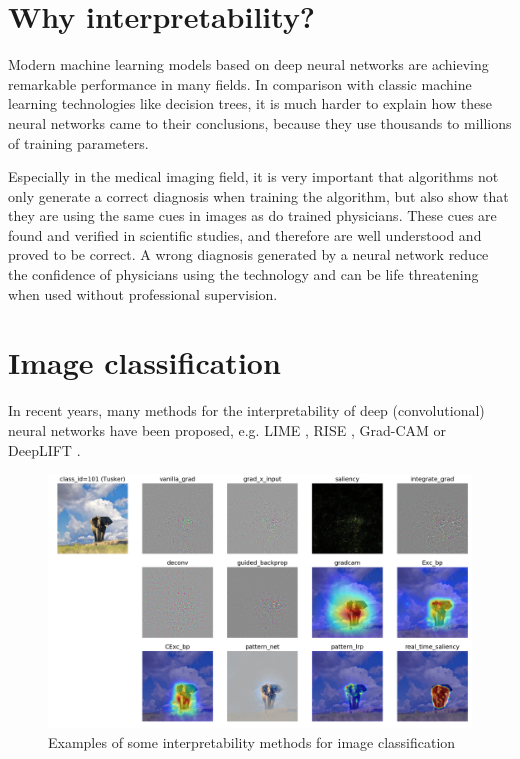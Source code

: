\section{Why interpretability?}
Modern machine learning models based on deep neural networks are achieving remarkable performance in many fields. In comparison with classic machine learning technologies like decision trees, it is much harder to explain how these neural networks came to their conclusions, because they use thousands to millions of training parameters.

Especially in the medical imaging field, it is very important that algorithms not only generate a correct diagnosis when training the algorithm, but also show that they are using the same cues in images as do trained physicians. These cues are found and verified in scientific studies, and therefore are well understood and proved to be correct. A wrong diagnosis generated by a neural network reduce the confidence of physicians using the technology and can be life threatening when used without professional supervision.

\section{Image classification}
In recent years, many methods for the interpretability of deep (convolutional) neural networks have been proposed, e.g. LIME \cite{ribeiro2016should}, RISE \cite{Petsiuk2018rise}, Grad-CAM \cite{selvaraju2017grad} or DeepLIFT \cite{shrikumar2017learning}.

\begin{figure}[h]
\centering
\caption{Examples of some interpretability methods for image classification \cite{visualattribution}}
\includegraphics[width=14cm]{images/tusker_saliency.png}
\end{figure}

